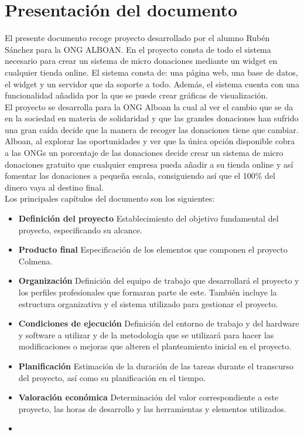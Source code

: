 \section{Presentación del documento}

El presente documento recoge proyecto desarrollado por el alumno Rubén Sánchez para la ONG ALBOAN. En el proyecto consta de todo el sistema necesario para crear un sistema de micro donaciones mediante un widget en cualquier tienda online. El sistema consta de: una página web, una base de datos, el widget y un servidor que da soporte a todo. Además, el sistema cuenta con una funcionalidad añadida por la que se puede crear gráficas de visualización.\\

El proyecto se desarrolla para la ONG Alboan la cual al ver el cambio que se da en la sociedad en materia de solidaridad y que las grandes donaciones han sufrido una gran caída decide que la manera de recoger las donaciones tiene que cambiar. Alboan, al explorar las oportunidades y ver que la única opción disponible cobra a las ONGs un porcentaje de las donaciones decide crear un sistema de micro donaciones gratuito que cualquier empresa pueda añadir a su tienda online y así fomentar las donaciones a pequeña escala, consiguiendo así que el 100\% del dinero vaya al destino final.\\

Los principales capítulos del documento son los siguientes:

\begin{itemize}
	\item \textbf{Definición del proyecto}\smallbreak
	Establecimiento del objetivo fundamental del proyecto, especificando su alcance.
	\item \textbf{Producto final}\smallbreak
	Especificación de los elementos que componen el proyecto Colmena.
	\item \textbf{Organización} \smallbreak
	Definición del equipo de trabajo que desarrollará el proyecto y los perfiles profesionales que formaran parte de este. También incluye la estructura organizativa y el sistema utilizado para gestionar el proyecto.
	\item \textbf{Condiciones de ejecución} \smallbreak
	Definición del entorno de trabajo y del hardware y software a utilizar y de la metodología que se utilizará para hacer las modificaciones o mejoras que alteren el planteamiento inicial en el proyecto.
	\item \textbf{Planificación} \smallbreak
	Estimación de la duración de las tareas durante el transcurso del proyecto, así como su planificación en el tiempo.
	\item \textbf{Valoración económica} \smallbreak
	Determinación del valor correspondiente a este proyecto, las horas de desarrollo y las herramientas y elementos utilizados.
	\item 
\end{itemize}

